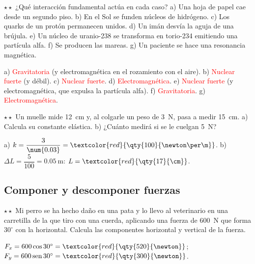\begin{exercise}
    \(\star\star\) ¿Qué interacción fundamental actúa en cada caso? a) Una hoja de papel cae desde un segundo piso. b) En el Sol se
    funden núcleos de hidrógeno. c) Los quarks de un protón permanecen unidos. d) Un imán desvía la aguja de una brújula. e) Un
    núcleo de uranio-238 se transforma en torio-234 emitiendo una partícula alfa. f) Se producen las mareas. g) Un paciente se hace
    una resonancia magnética.
    \begin{solu}
        a) \textcolor{red}{Gravitatoria} (y electromagnética en el rozamiento con el aire). b) \textcolor{red}{Nuclear fuerte}
        (y débil). c) \textcolor{red}{Nuclear fuerte}. d) \textcolor{red}{Electromagnética}. e) \textcolor{red}{Nuclear fuerte} (y
        electromagnética, que expulsa la partícula alfa). f) \textcolor{red}{Gravitatoria}. g) \textcolor{red}{Electromagnética}.
    \end{solu}
\end{exercise}

\begin{exercise}
    \(\star\star\) Un muelle mide \qty{12}{\cm} y, al colgarle un peso de \qty{3}{\newton}, pasa a medir \qty{15}{\cm}. a) Calcula su
    constante elástica. b) ¿Cuánto medirá si se le cuelgan \qty{5}{\newton}?
    \begin{solu}
        a) \(k = \dfrac{3}{\num{0.03}} = \textcolor{red}{\qty{100}{\newton\per\m}}\). b) \(\Delta L = \dfrac{5}{100} = \qty{0.05}{\m}\):
        \(L = \textcolor{red}{\qty{17}{\cm}}\).
    \end{solu}
\end{exercise}

\subsection{Componer y descomponer fuerzas}

\begin{exercise}
    \(\star\star\) Mi perro se ha hecho daño en una pata y lo llevo al veterinario en una carretilla de la que tiro con una cuerda,
    aplicando una fuerza de \qty{600}{\newton} que forma \(30^\circ\) con la horizontal. Calcula las componentes horizontal y vertical
    de la fuerza.
    \begin{solu}
        \(F_x = 600\cos 30^\circ = \textcolor{red}{\qty{520}{\newton}}\); \(F_y = 600\sen 30^\circ = \textcolor{red}{\qty{300}{\newton}}\).
    \end{solu}
\end{exercise}

